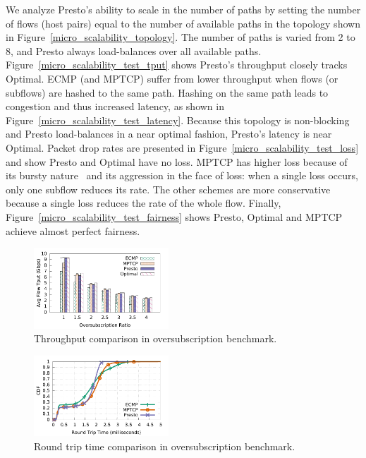 We analyze Presto's ability to scale in the number of paths by
setting the number of flows (host pairs) equal to the number of available paths in the topology shown in 
Figure~\ref{micro_scalability_topology}. The number of paths is varied from 2 to 8, and 
Presto always load-balances over all available paths.
Figure~\ref{micro_scalability_test_tput} shows Presto's throughput closely tracks Optimal. 
ECMP (and MPTCP) suffer from lower throughput when flows (or subflows) are
hashed to the same path. Hashing on the same path leads to congestion and thus increased latency, as shown in Figure~\ref{micro_scalability_test_latency}.
Because this topology is non-blocking and Presto load-balances in a near optimal fashion, Presto's latency
is near Optimal. Packet drop rates are presented in Figure~\ref{micro_scalability_test_loss} and show
Presto and Optimal have no loss. MPTCP has higher loss because of its bursty nature~\cite{conga}
and its aggression in the face of loss: when a single loss occurs, only
one subflow reduces its rate. The other schemes are more conservative because a single loss reduces the rate of the whole flow.
Finally, Figure~\ref{micro_scalability_test_fairness} shows Presto, Optimal and MPTCP
achieve almost perfect fairness.


\begin{figure}[t]
        \centering
  \includegraphics[width=0.45\textwidth]{presto/figures/congestion_test/congestion_compare_tput_witherrbar.pdf}
        \caption{Throughput comparison in oversubscription benchmark.}
        \label{micro_congestion_test_tput}
\end{figure}


\begin{figure}[t]
        \centering
  \includegraphics[width=0.45\textwidth]{presto/figures/congestion_test/congestion_compare_latency.pdf}
        \caption{Round trip time comparison in oversubscription benchmark.
		}
        \label{micro_congestion_test_latency}
\end{figure}



